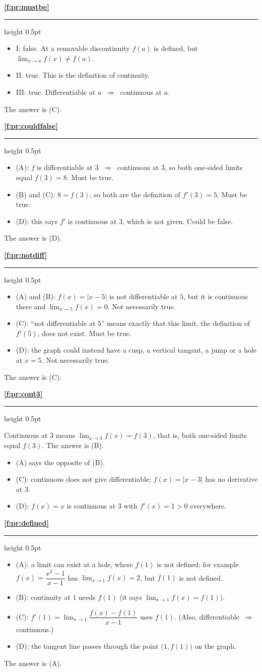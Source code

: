 \documentclass[11pt,a4paper]{article}
\newcounter{example}
\newcommand{\solitem}[2]{%
 \par\addvspace{16pt}\Needspace{10\baselineskip}%
 {\large\bfseries \ref{#1}}\par\nobreak\vspace{2pt}%
 {\color{rulegray}\hrule height 0.5pt}\nobreak\vspace{7pt}%
 #2\par}
\newcommand{\imp}{\ \Longrightarrow\ }
\begin{document}
\solitem{f:pr:mustbe}{%
\begin{itemize}
 \item I: false. At a removable discontinuity $f(a)$ is defined, but $\displaystyle\lim_{x\to a}f(x)\ne f(a)$.
 \item II: true. This is the definition of continuity.
 \item III: true. Differentiable at $a$ $\imp$ continuous at $a$.
\end{itemize}
The answer is (C).
}

\solitem{f:pr:couldfalse}{%
\begin{itemize}
 \item (A): $f$ is differentiable at $3$ $\imp$ continuous at $3$, so both one-sided limits equal $f(3)=8$. Must be true.
 \item (B) and (C): $8=f(3)$, so both are the definition of $f'(3)=5$. Must be true.
 \item (D): this says $f'$ is continuous at $3$, which is not given. Could be false.
\end{itemize}
The answer is (D).
}

\solitem{f:pr:notdiff}{%
\begin{itemize}
 \item (A) and (B): $f(x)=|x-5|$ is not differentiable at $5$, but it is continuous there and $\displaystyle\lim_{x\to5}f(x)=0$. Not necessarily true.
 \item (C): ``not differentiable at $5$'' means exactly that this limit, the definition of $f'(5)$, does not exist. Must be true.
 \item (D): the graph could instead have a cusp, a vertical tangent, a jump or a hole at $x=5$. Not necessarily true.
\end{itemize}
The answer is (C).
}

\solitem{f:pr:cont3}{%
Continuous at $3$ means $\displaystyle\lim_{x\to3}f(x)=f(3)$, that is, both one-sided limits equal $f(3)$. The answer is (B).
\begin{itemize}
 \item (A) says the opposite of (B).
 \item (C): continuous does not give differentiable; $f(x)=|x-3|$ has no derivative at $3$.
 \item (D): $f(x)=x$ is continuous at $3$ with $f'(x)=1>0$ everywhere.
\end{itemize}
}

\solitem{f:pr:defined}{%
\begin{itemize}
 \item (A): a limit can exist at a hole, where $f(1)$ is not defined; for example $f(x)=\dfrac{x^2-1}{x-1}$ has $\displaystyle\lim_{x\to1}f(x)=2$, but $f(1)$ is not defined.
 \item (B): continuity at $1$ needs $f(1)$ (it says $\displaystyle\lim_{x\to1}f(x)=f(1)$).
 \item (C): $f'(1)=\displaystyle\lim_{x\to1}\dfrac{f(x)-f(1)}{x-1}$ uses $f(1)$. (Also, differentiable $\imp$ continuous.)
 \item (D): the tangent line passes through the point $\bigl(1,f(1)\bigr)$ on the graph.
\end{itemize}
The answer is (A).
}
\end{document}
